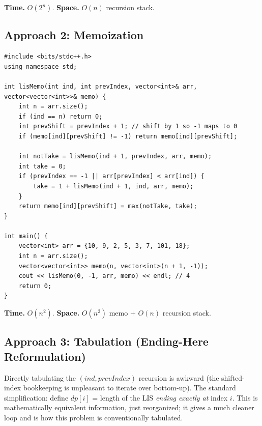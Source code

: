 \begin{complexitybox}
\textbf{Time.} $O(2^n)$.
\textbf{Space.} $O(n)$ recursion stack.
\end{complexitybox}

\subsection*{Approach 2: Memoization}

\begin{lstlisting}
#include <bits/stdc++.h>
using namespace std;

int lisMemo(int ind, int prevIndex, vector<int>& arr, vector<vector<int>>& memo) {
    int n = arr.size();
    if (ind == n) return 0;
    int prevShift = prevIndex + 1; // shift by 1 so -1 maps to 0
    if (memo[ind][prevShift] != -1) return memo[ind][prevShift];

    int notTake = lisMemo(ind + 1, prevIndex, arr, memo);
    int take = 0;
    if (prevIndex == -1 || arr[prevIndex] < arr[ind]) {
        take = 1 + lisMemo(ind + 1, ind, arr, memo);
    }
    return memo[ind][prevShift] = max(notTake, take);
}

int main() {
    vector<int> arr = {10, 9, 2, 5, 3, 7, 101, 18};
    int n = arr.size();
    vector<vector<int>> memo(n, vector<int>(n + 1, -1));
    cout << lisMemo(0, -1, arr, memo) << endl; // 4
    return 0;
}
\end{lstlisting}

\begin{complexitybox}
\textbf{Time.} $O(n^2)$.
\textbf{Space.} $O(n^2)$ memo $+$ $O(n)$ recursion stack.
\end{complexitybox}

\subsection*{Approach 3: Tabulation (Ending-Here Reformulation)}

\begin{ideabox}
Directly tabulating the $(\textit{ind}, \textit{prevIndex})$ recursion
is awkward (the shifted-index bookkeeping is unpleasant to iterate over
bottom-up). The standard simplification: define
$\textit{dp}[i]$ = length of the LIS \emph{ending exactly at} index $i$.
This is mathematically equivalent information, just reorganized; it
gives a much cleaner loop and is how this problem is conventionally
tabulated.
\end{ideabox}

